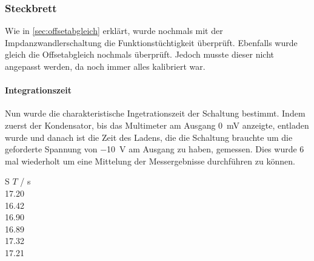 \documentclass[12pt,english,ngerman]{scrartcl}
\begin{document}
\subsubsection{Steckbrett}
Wie in \autoref{sec:offsetabgleich} erklärt, wurde nochmals mit der
Impdanzwandlerschaltung die Funktionstüchtigkeit überprüft. Ebenfalls wurde
gleich die Offsetabgleich nochmals überprüft. Jedoch musste dieser nicht
angepasst werden, da noch immer alles kalibriert war.




\paragraph{Integrationszeit}
Nun wurde die charakteristische Ingetrationszeit der Schaltung bestimmt. Indem
zuerst der Kondensator, bis das Multimeter am Ausgang \SI{0}{\mV} anzeigte,
entladen wurde und danach ist die Zeit des Ladens, die die Schaltung brauchte
um die geforderte Spannung von \SI{-10}{\volt} am Ausgang zu haben, gemessen.
Dies wurde 6 mal wiederholt um eine Mittelung der Messergebnisse durchführen zu
können.

\begin{table}[H]
  \caption{Messungen der Integrationszeit der realen Integratorschaltung aus
  \autoref{fig:sim_integrator_schaltung}, wobei $T$ die Ladezeit bis am Ausgang
  \SI{-10}{\volt} anliegt. Bei einem Ladespannung \SI{91.8}{\milli\volt}, einem
  Widerstand von \SI{21.9}{\kilo\ohm} und einer Kapazität von
  \SI{6.8}{\micro\farad} }
  \label{tab:messungen_integration}
  \centering
  \begin{tabular}[c]{S}
    {$T$ / \si{\second}} \\
    17.20 \\
    16.42 \\
    16.90 \\
    16.89 \\
    17.32 \\
    17.21 \\
  \end{tabular}
\end{table}
\end{document}
